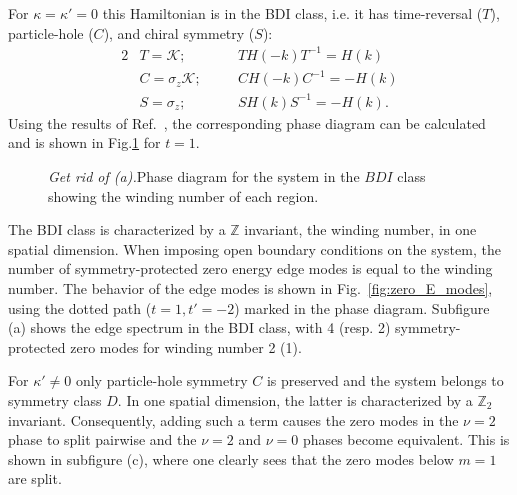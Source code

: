 \documentclass[twocolumn,amsmath,longbibliography,amssymb,superscriptaddress]{revtex4-1}
\newcommand{\mariac}[1]{{\it\color{cyan}#1}}
\begin{document}
For $\kappa = \kappa' = 0$ this Hamiltonian is in the BDI class, i.e. it has time-reversal ($T$), particle-hole ($C$), and chiral symmetry ($S$):
\begin{alignat}{2}
&T = \mathcal{K} ; \quad &&T H(-k) T^{-1} = H(k) \nonumber\\
&C = \sigma_z\mathcal{K} ; \quad &&C H(-k) C^{-1} = -H(k) \nonumber\\
&S = \sigma_z ; \quad &&S H(k)S^{-1} = -H(k) .
\end{alignat}
Using the results of Ref.~\cite{Song2014}, the corresponding phase diagram can be calculated and is shown in Fig.\ref{fig:bdi_phase_diagram} for $t=1$. 
\begin{figure}[t]
	\centering
	\hspace{0mm}
\caption{\mariac{ Get rid of (a).}Phase diagram for the system in the $BDI$ class showing the winding number of each region.}
\label{fig:bdi_phase_diagram}
\end{figure}
The BDI class  is characterized by a $\mathbb{Z}$ invariant, the winding number,  in one spatial dimension.
When imposing open boundary conditions on the system, the number of symmetry-protected zero energy edge modes is equal to the winding number. 
The behavior of the  edge modes  is  shown in Fig.~\ref{fig:zero_E_modes}, using the dotted path ($t=1,t'=-2$) marked in the phase diagram. 
Subfigure (a) shows the edge spectrum in the BDI class, with 4 (resp. 2) symmetry-protected zero modes for winding number 2 (1). 

For $\kappa' \neq 0$ only particle-hole symmetry $C$ is preserved and the system belongs to symmetry class $D$. 
In one spatial dimension, the latter is characterized by a $\mathbb{Z}_2$ invariant.  
Consequently, adding such a term causes the zero modes in the $\nu=2$ phase to split  pairwise and the $\nu = 2$ and $\nu=0$ phases become equivalent. 
This is shown in subfigure (c), where one clearly sees that the zero modes below $m=1$ are split. 
\end{document}
